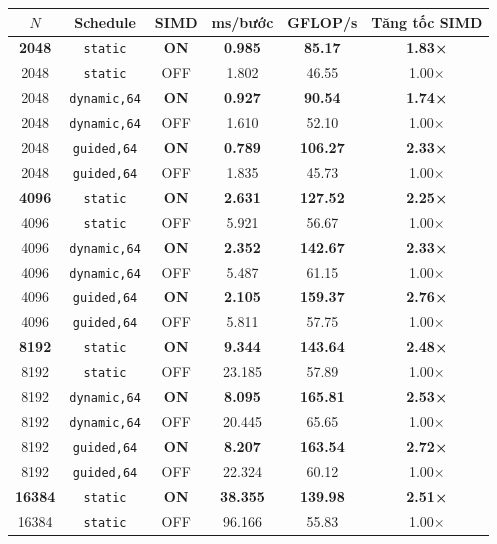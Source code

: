 \begin{table}[H]
\centering\small
\begin{tabular}{cccccc}
\toprule
\textbf{$N$} & \textbf{Schedule} & \textbf{SIMD} & \textbf{ms/bước} & \textbf{GFLOP/s} & \textbf{Tăng tốc SIMD} \\
\midrule
\textbf{2048} & \texttt{static} & \textbf{ON} & \textbf{0.985} & \textbf{85.17} & \textbf{1.83×} \\
2048 & \texttt{static} & OFF & 1.802 & 46.55 & 1.00× \\
2048 & \texttt{dynamic,64} & \textbf{ON} & \textbf{0.927} & \textbf{90.54} & \textbf{1.74×} \\
2048 & \texttt{dynamic,64} & OFF & 1.610 & 52.10 & 1.00× \\
2048 & \texttt{guided,64} & \textbf{ON} & \textbf{0.789} & \textbf{106.27} & \textbf{2.33×} \\
2048 & \texttt{guided,64} & OFF & 1.835 & 45.73 & 1.00× \\
\textbf{4096} & \texttt{static} & \textbf{ON} & \textbf{2.631} & \textbf{127.52} & \textbf{2.25×} \\
4096 & \texttt{static} & OFF & 5.921 & 56.67 & 1.00× \\
4096 & \texttt{dynamic,64} & \textbf{ON} & \textbf{2.352} & \textbf{142.67} & \textbf{2.33×} \\
4096 & \texttt{dynamic,64} & OFF & 5.487 & 61.15 & 1.00× \\
4096 & \texttt{guided,64} & \textbf{ON} & \textbf{2.105} & \textbf{159.37} & \textbf{2.76×} \\
4096 & \texttt{guided,64} & OFF & 5.811 & 57.75 & 1.00× \\
\textbf{8192} & \texttt{static} & \textbf{ON} & \textbf{9.344} & \textbf{143.64} & \textbf{2.48×} \\
8192 & \texttt{static} & OFF & 23.185 & 57.89 & 1.00× \\
8192 & \texttt{dynamic,64} & \textbf{ON} & \textbf{8.095} & \textbf{165.81} & \textbf{2.53×} \\
8192 & \texttt{dynamic,64} & OFF & 20.445 & 65.65 & 1.00× \\
8192 & \texttt{guided,64} & \textbf{ON} & \textbf{8.207} & \textbf{163.54} & \textbf{2.72×} \\
8192 & \texttt{guided,64} & OFF & 22.324 & 60.12 & 1.00× \\
\textbf{16384} & \texttt{static} & \textbf{ON} & \textbf{38.355} & \textbf{139.98} & \textbf{2.51×} \\
16384 & \texttt{static} & OFF & 96.166 & 55.83 & 1.00× \\

\end{tabular}
\end{table}
